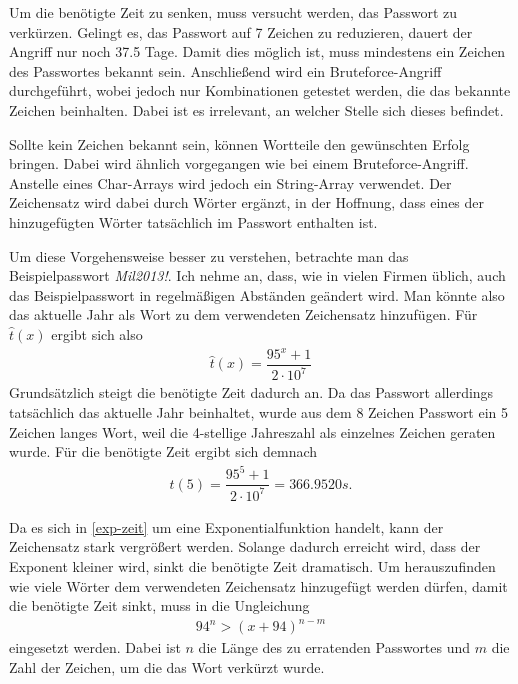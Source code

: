 \documentclass[12pt,a4paper]{scrartcl}
\newcommand{\spar}{\par\vspace{10pt}\noindent}
\numberwithin{equation}{section}
\numberwithin{myalgctr}{section}
\numberwithin{mytheoremctr}{section}
\begin{document}
	\newpage \noindent
	 Um die benötigte Zeit zu senken, muss versucht werden, das Passwort zu verkürzen. Gelingt es, das Passwort auf 7 Zeichen zu reduzieren, dauert der Angriff nur noch 37.5 Tage. Damit dies möglich ist, muss mindestens ein Zeichen des Passwortes bekannt sein. Anschließend wird ein Bruteforce-Angriff durchgeführt, wobei jedoch nur Kombinationen getestet werden, die das bekannte Zeichen beinhalten. Dabei ist es irrelevant, an welcher Stelle sich dieses befindet.
	\spar
	Sollte kein Zeichen bekannt sein, können Wortteile den gewünschten Erfolg bringen. Dabei wird ähnlich vorgegangen wie bei einem Bruteforce-Angriff. Anstelle eines Char-Arrays wird jedoch ein String-Array verwendet. Der Zeichensatz wird dabei durch Wörter ergänzt, in der Hoffnung, dass eines der hinzugefügten Wörter tatsächlich im Passwort enthalten ist.
	\spar
	Um diese Vorgehensweise besser zu verstehen, betrachte man das Beispielpasswort {\itshape Mil2013!}. Ich nehme an, dass, wie in vielen Firmen üblich, auch das Beispielpasswort in regelmäßigen Abständen geändert wird. Man könnte also das aktuelle Jahr als Wort zu dem verwendeten Zeichensatz hinzufügen. Für $\hat{t}(x)$ ergibt sich also
	\begin{align}
		\hat{t}(x) = \dfrac{95^x+1}{2\cdot 10^{7}} \label{exp-zeit}
	\end{align}
	\newpage \noindent
	Grundsätzlich steigt die benötigte Zeit dadurch an. Da das Passwort allerdings tatsächlich das aktuelle Jahr beinhaltet, wurde aus dem 8 Zeichen Passwort ein 5 Zeichen langes Wort, weil die 4-stellige Jahreszahl als einzelnes Zeichen geraten wurde. Für die benötigte Zeit ergibt sich demnach
	\begin{align}
		\hat{t}(5)= \dfrac{95^5+1}{2\cdot 10^{7}} = 366.9520s. \label{supst-exp-zeit}
	\end{align}
	\spar
	Da es sich in \eqref{exp-zeit} um eine Exponentialfunktion handelt, kann der Zeichensatz stark vergrößert werden. Solange dadurch erreicht wird, dass der Exponent kleiner wird, sinkt die benötigte Zeit dramatisch. Um herauszufinden wie viele Wörter dem verwendeten Zeichensatz hinzugefügt werden dürfen, damit die benötigte Zeit sinkt, muss in die Ungleichung
	\begin{align}
		94^n > (x+94)^{n-m} \label{ungleichung}
	\end{align}
	eingesetzt werden. Dabei ist $n$ die Länge des zu erratenden Passwortes und $m$ die Zahl der Zeichen, um die das Wort verkürzt wurde.\\
\end{document}
